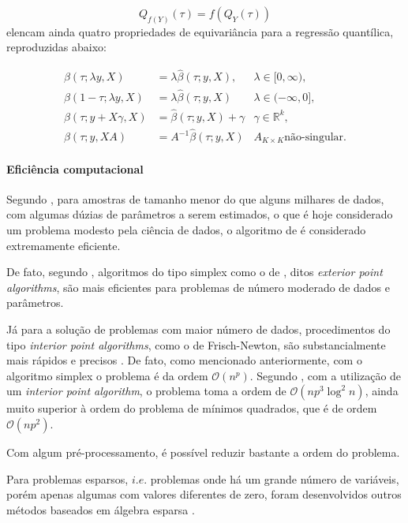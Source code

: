\documentclass[a4paper, 12pt]{article}
\let\oldparagraph\paragraph
\renewcommand{\paragraph}[1]{\oldparagraph{#1}\mbox{}}
\begin{document}
\[Q_{f(Y)}(\tau) = f(Q_Y(\tau))\] \textcite[p.~39-40]{koenker1978}
elencam ainda quatro propriedades de equivariância para a regressão
quantílica, reproduzidas abaixo:

\[
\begin{aligned}
\hat \beta(\tau;\lambda y,X) &= \lambda \hat \beta(\tau; y, X), & \lambda \in[0,\infty), \\
\hat \beta(1-\tau;\lambda y,X) &= \lambda \hat \beta(\tau; y, X) & \lambda \in (-\infty,0],\\
\hat \beta(\tau;y + X\gamma,X)& = \hat \beta(\tau; y, X) + \gamma & \gamma \in \mathbb{R}^k,\\
\hat \beta(\tau;y,XA) &= A^{-1} \hat \beta(\tau; y, X) & A_{K \times K} \text{não-singular.}
\end{aligned}
\]

\hypertarget{eficiencia-computacional}{%
\paragraph{Eficiência computacional}\label{eficiencia-computacional}}

Segundo \textcite[p.~3]{conopt}, para amostras de tamanho menor do que
alguns milhares de dados, com algumas dúzias de parâmetros a serem
estimados, o que é hoje considerado um problema modesto pela ciência de
dados, o algoritmo de \textcite{barrodale} é considerado extremamente
eficiente.

De fato, segundo \textcite[p.~6]{conopt}, algoritmos do tipo simplex
como o de \textcite{barrolade}, ditos \emph{exterior point algorithms},
são mais eficientes para problemas de número moderado de dados e
parâmetros.

Já para a solução de problemas com maior número de dados, procedimentos
do tipo \emph{interior point algorithms}, como o de Frisch-Newton, são
substancialmente mais rápidos e precisos \autocite[6]{conopt}. De fato,
como mencionado anteriormente, com o algoritmo simplex o problema é da
ordem \(\mathcal{O}(n^p)\). Segundo \textcite[p.~369]{koenker2000}, com
a utilização de um \emph{interior point algorithm}, o problema toma a
ordem de \(\mathcal{O}(np^3\log^2n)\), ainda muito superior à ordem do
problema de mínimos quadrados, que é de ordem \(\mathcal{O}(np^2)\).

Com algum pré-processamento, é possível reduzir bastante a ordem do
problema.

Para problemas esparsos, \(i.e.\) problemas onde há um grande número de
variáveis, porém apenas algumas com valores diferentes de zero, foram
desenvolvidos outros métodos baseados em álgebra esparsa
\autocite[ver][]{koenker2005}.
\end{document}
